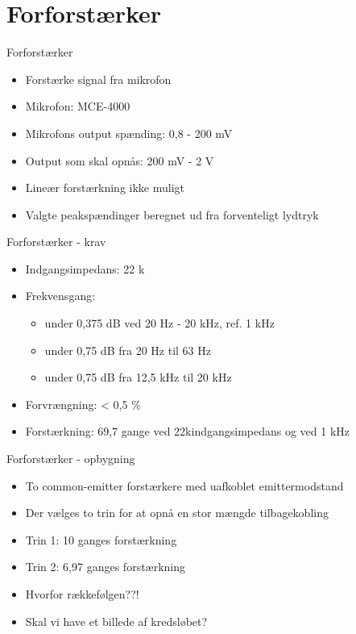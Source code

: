 \section{Forforstærker}

\begin{frame}{Forforstærker}
\begin{itemize}
\item Forstærke signal fra mikrofon
\item Mikrofon: MCE-4000
\item Mikrofons output spænding: 0,8 - 200 mV
\item Output som skal opnås: 200 mV - 2 V
\item Lineær forstærkning ikke muligt
\item Valgte peakspændinger beregnet ud fra forventeligt lydtryk
\end{itemize}
\end{frame}

\begin{frame}{Forforstærker - krav}
\begin{itemize}
\item Indgangsimpedans: 22 k\ohm
\item Frekvensgang: 
\begin{itemize}
\item  under 0,375 dB ved 20 Hz - 20 kHz, ref. 1 kHz 
\item  under 0,75 dB fra 20 Hz til 63 Hz 
\item  under 0,75 dB fra 12,5 kHz til 20 kHz
\end{itemize}
\item Forvrængning: < 0,5 \%
\item Forstærkning: 69,7 gange ved 22k\ohm indgangsimpedans og ved 1 kHz
\end{itemize}
\end{frame}

\begin{frame}{Forforstærker - opbygning}
\begin{itemize}
\item To common-emitter forstærkere med uafkoblet emittermodstand
\item Der vælges to trin for at opnå en stor mængde tilbagekobling
\item Trin 1: 10 ganges forstærkning
\item Trin 2: 6,97 ganges forstærkning
\item Hvorfor rækkefølgen??!
\item Skal vi have et billede af kredsløbet?
\end{itemize}
\end{frame}

